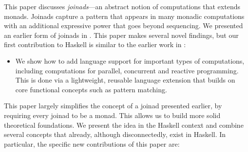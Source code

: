 \documentclass[preprint]{sigplanconf}
\begin{document}
This paper discusses \textit{joinads}---an abstract notion of computations that extends monads.
Joinads capture a pattern that appears in many monadic computations with an additional expressive 
power that goes beyond sequencing. We presented an earlier form of joinads in \fsharp \cite{joinads}. 
This paper makes several novel findings, but our first contribution to Haskell is similar to the 
earlier work in \fsharp:

\begin{itemize}
\item  We show how to add language support for important types of computations, including computations 
  for parallel, concurrent and reactive programming. This is done via a lightweight, reusable language 
  extension that builds on core functional concepts such as pattern matching.
\end{itemize}
This paper largely simplifies the concept of a joinad presented earlier, by requiring every joinad to 
be a monad. This allows us to build more solid theoretical foundations. We present the idea in the 
Haskell context and combine several concepts that already, although disconnectedly, exist in Haskell.
In particular, the specific new contributions of this paper are:
\end{document}

